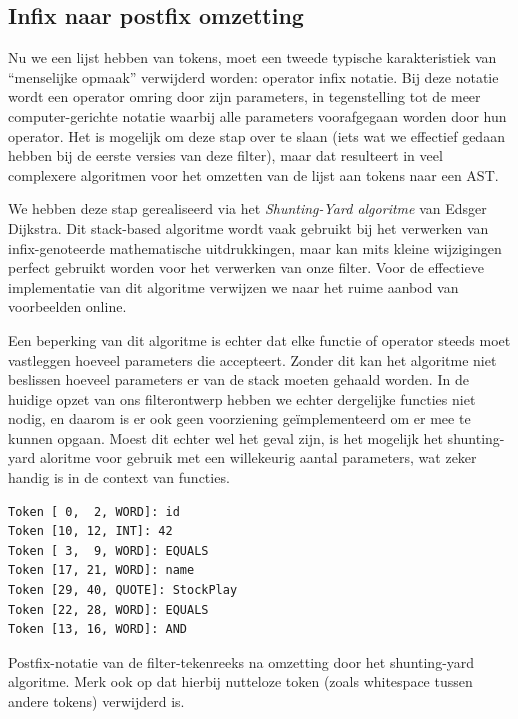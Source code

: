 \subsection{Infix naar postfix omzetting}

Nu we een lijst hebben van tokens, moet een tweede typische karakteristiek van ``menselijke opmaak'' verwijderd worden: operator infix notatie. Bij deze notatie wordt een operator omring door zijn parameters, in tegenstelling tot de meer computer-gerichte notatie waarbij alle parameters voorafgegaan worden door hun operator. Het is mogelijk om deze stap over te slaan (iets wat we effectief gedaan hebben bij de eerste versies van deze filter), maar dat resulteert in veel complexere algoritmen voor het omzetten van de lijst aan tokens naar een AST.

We hebben deze stap gerealiseerd via het \emph{Shunting-Yard algoritme} van Edsger Dijkstra. Dit stack-based algoritme wordt vaak gebruikt bij het verwerken van infix-genoteerde mathematische uitdrukkingen, maar kan mits kleine wijzigingen perfect gebruikt worden voor het verwerken van onze filter. Voor de effectieve implementatie van dit algoritme verwijzen we naar het ruime aanbod van voorbeelden online.

Een beperking van dit algoritme is echter dat elke functie of operator steeds moet vastleggen hoeveel parameters die accepteert. Zonder dit kan het algoritme niet beslissen hoeveel parameters er van de stack moeten gehaald worden. In de huidige opzet van ons filterontwerp hebben we echter dergelijke functies niet nodig, en daarom is er ook geen voorziening ge\"implementeerd om er mee te kunnen opgaan. Moest dit echter wel het geval zijn, is het mogelijk het shunting-yard aloritme  voor gebruik met een willekeurig aantal parameters, wat zeker handig is in de context van functies.

\begin{code}
\begin{verbatim}
Token [ 0,  2, WORD]: id
Token [10, 12, INT]: 42
Token [ 3,  9, WORD]: EQUALS
Token [17, 21, WORD]: name
Token [29, 40, QUOTE]: StockPlay
Token [22, 28, WORD]: EQUALS
Token [13, 16, WORD]: AND
\end{verbatim}
\caption{Postfix-notatie van de filter-tekenreeks na omzetting door het shunting-yard algoritme. Merk ook op dat hierbij nutteloze token (zoals whitespace tussen andere tokens) verwijderd is.}
\end{code}

